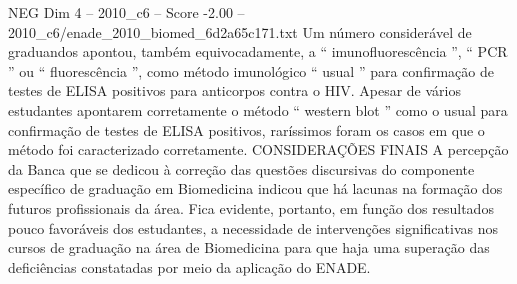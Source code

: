 \begin{textsample}{NEG Dim 4 – 2010\_c6 – Score -2.00 – 2010\_c6/enade\_2010\_biomed\_6d2a65c171.txt}
Um número considerável de graduandos apontou, também equivocadamente, a “ imunofluorescência ”, “ PCR ” ou “ fluorescência ”, como método imunológico “ usual ” para confirmação de testes de ELISA positivos para anticorpos contra o HIV.
Apesar de vários estudantes apontarem corretamente o método “ western blot ” como o usual para confirmação de testes de ELISA positivos, raríssimos foram os casos em que o método foi caracterizado corretamente.
CONSIDERAÇÕES FINAIS A percepção da Banca que se dedicou à correção das questões discursivas do componente específico de graduação em Biomedicina indicou que há lacunas na formação dos futuros profissionais da área.
Fica evidente, portanto, em função dos resultados pouco favoráveis dos estudantes, a necessidade de intervenções significativas nos cursos de graduação na área de Biomedicina para que haja uma superação das deficiências constatadas por meio da aplicação do ENADE.

\end{textsample}

